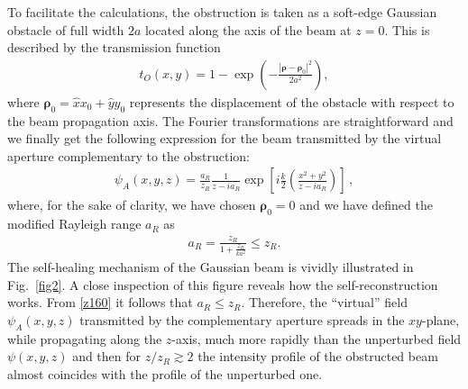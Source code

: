 \documentclass[10pt]{article}
\newcommand{\vrho}{\bm{\rho}}
\begin{document}
To facilitate the calculations, the obstruction is taken as a
soft-edge Gaussian obstacle of full width $2a$ located along the axis
of the beam at $z=0$.  This is described by the transmission function
\begin{align}
  \label{pz100}
  t_O(x,y) = 1 - \exp\left(-  \frac{| \vrho -\vrho_0|^2}{2 a^2}\right),
\end{align}
where $\vrho_0 = \hat{x} x_0 + \hat{y} y_0$ represents the
displacement of the obstacle with respect to the beam propagation
axis.  The Fourier transformations are straightforward and we finally get the
following expression for the beam transmitted by the virtual aperture
complementary to the obstruction: 
\begin{align}
  \label{z150}
  \psi_A(x,y,z) = \frac{a_R}{z_R}\frac{1}{z - i a_R} 
  \exp\left[  
  i \frac{k}{2} \left(\frac{ x^2 + y^2}{z - i  a_R}\right)\right] \, , 
\end{align}
where, for the sake of clarity, we have chosen $\vrho_0 = 0$ and we
have defined the modified Rayleigh range $a_R$  as
\begin{align}
  \label{z160}
  a_R = \frac{\displaystyle{z_R}}{\displaystyle{1 + \frac{z_R}{k a^2}}} \leq z_R.
\end{align}
The self-healing mechanism of the Gaussian beam is vividly
illustrated in Fig.~\ref{fig2}. A close inspection of this figure
reveals how the self-reconstruction works. From \eqref{z160} it
follows that $a_R \leq z_R$. Therefore, the ``virtual'' field
$\psi_A(x,y,z)$ transmitted by the complementary aperture spreads in
the $xy$-plane, while propagating along the $z$-axis, much more
rapidly than the unperturbed field $\psi(x,y,z)$ and then for
$z/z_{R} \gtrsim 2$ the intensity profile of the obstructed beam
almost coincides with the profile of the unperturbed one.
\end{document}
